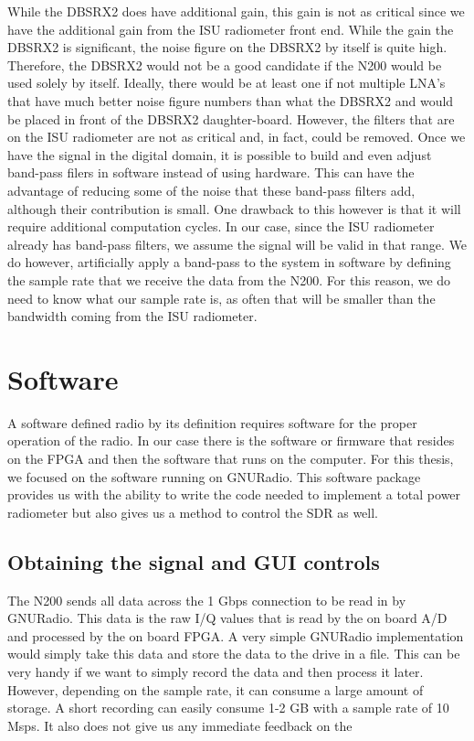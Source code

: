 While the DBSRX2 does have additional gain, this gain is not as critical since we have the additional gain from the ISU radiometer front end.  While the gain the DBSRX2 is significant, the noise figure on the DBSRX2 by itself is quite high.  Therefore, the DBSRX2 would not be a good candidate if the N200 would be used solely by itself.  Ideally, there would be at least one if not multiple LNA's that have much better noise figure numbers than what the DBSRX2 and would be placed in front of the DBSRX2 daughter-board.  However, the filters that are on the ISU radiometer are not as critical and, in fact, could be removed.  Once we have the signal in the digital domain, it is possible to build and even adjust band-pass filers in software instead of using hardware. This can have the advantage of reducing some of the noise that these band-pass filters add, although their contribution is small.  One drawback to this however is that it will require additional computation cycles.  In our case, since the ISU radiometer already has band-pass filters, we assume the signal will be valid in that range.  We do however, artificially apply a band-pass to the system in software by defining the sample rate that we receive the data from the N200.  For this reason, we do need to know what our sample rate is, as often that will be smaller than the bandwidth coming from the ISU radiometer. 

\section{Software}

A software defined radio by its definition requires software for the proper operation of the radio.  In our case there is the software or firmware that resides on the FPGA and then the software that runs on the computer.  For this thesis, we focused on the software running on GNURadio.  This software package provides us with the ability to write the code needed to implement a total power radiometer but also gives us a method to control the SDR as well.  

\subsection{Obtaining the signal and GUI controls}

The N200 sends all data across the 1 Gbps connection to be read in by GNURadio.  This data is the raw I/Q values that is read by the on board A/D and processed by the on board FPGA.  A very simple GNURadio implementation would simply take this data and store the data to the drive in a file.  This can be very handy if we want to simply record the data and then process it later.  However, depending on the sample rate, it can consume a large amount of storage.  A short recording can easily consume 1-2 GB with a sample rate of 10 Msps.  It also does not give us any immediate feedback on the 

